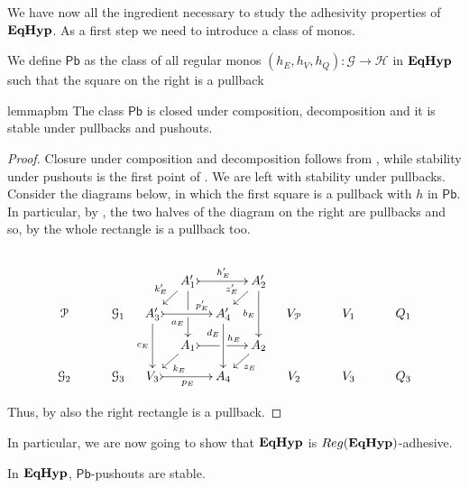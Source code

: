 \documentclass[a4paper,UKenglish,cleveref,pdftex,thm-restate,numberwithinsect]{lipics-v2021}
\newcommand{\pbc}{\mathsf{Pb}}
\newcommand{\catname}[1]{\textbf{\textup{#1}}}
\newcommand{\EqHyp}{\catname{EqHyp}} %
\newcommand{\reg}{\mathsf{Reg}}
\begin{document}
We have now all the ingredient necessary to study the adhesivity properties of $\EqHyp$.  As a first step we need to introduce a class of monos.

\begin{definition}
	We define $\pbc$ as the class of all regular monos $(h_E, h_V, h_Q)\colon \mathcal{G}\to \mathcal{H}$ in $\EqHyp$ such that the square on the right is a pullback
\end{definition}


\begin{restatable}{lemma}{pbm}\label{lem:pbmono}
	The class $\pbc$ is closed under composition, decomposition and it is stable under pullbacks and pushouts.
\end{restatable}
\begin{proof}
	Closure under composition and decomposition follows from , while stability under pushouts is the first point of . We are left with stability under pullbacks. Consider the diagrams below, in which the first square is a pullback with $h$ in $\pbc$. In particular, by , the two halves of the diagram on the right are pullbacks and so, by  the whole rectangle is a pullback too.
	
	\[\]
	
	
		\[
	\xymatrix@C=10pt@R=10pt{&& & &A_1'\ar[dd]|\hole_(.65){a_E}\ar@{>->}[rr]^{h_E'} \ar[dl]_{k_E'} && A_2' \ar[dd]_{b_E} \ar[dl]_{z_E'}  \\\mathcal{P} & & \mathcal{G}_1 &
	A_3'  \ar[dd]_{c_E}\ar@{>->}[rr]^(.7){p_E'} & & A_4' \ar[dd]_(.3){d_E}
	&& V_{\mathcal{P}} && V_1 && Q_1\\
	 &&&&A_1\ar@{>->}[rr]|\hole^(.65){h_E} \ar[dl]^{k_E} && A_2 \ar[dl]^{z_E}  \\
		\mathcal{G}_2 && \mathcal{G}_3 & V_3 \ar@{>->}[rr]_{p_E} & & A_4 && V_2 && V_3 && Q_3 }
	\]
	
	Thus, by  also the right rectangle is a pullback.
\end{proof}






In particular, we are now going to show that $\EqHyp$ is $\reg(\EqHyp)$-adhesive.

\begin{lemma}\label{lemma:stab}
	In $\EqHyp$, $\pbc$-pushouts are stable.
\end{lemma}
\end{document}
